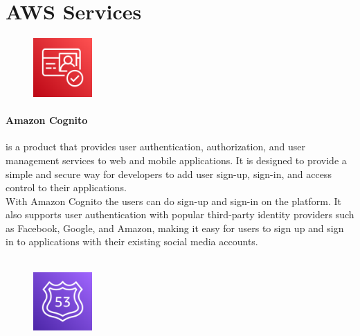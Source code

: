 \documentclass[a4paper,12pt]{report}
\begin{document}
\section{AWS Services}

%
\begin{figure}
  \centering
  \includegraphics[width=0.2\textwidth]{img/services/cognito}
\end{figure}
%
%
\paragraph{Amazon Cognito} is a product that provides user authentication, authorization, and user management services to web and mobile applications. It is designed to provide a simple and secure way for developers to add user sign-up, sign-in, and access control to their applications.\\
With Amazon Cognito the users can do sign-up and sign-in on the platform. It also supports user authentication with popular third-party identity providers such as Facebook, Google, and Amazon, making it easy for users to sign up and sign in to applications with their existing social media accounts.\\\\
%
%
%
\begin{figure}
  \centering
  \includegraphics[width=0.2\textwidth]{img/services/Route-53}
\end{figure}
%
\end{document}
